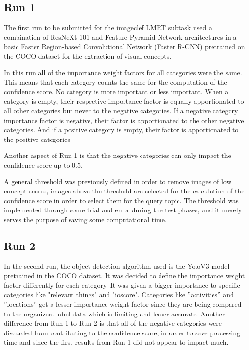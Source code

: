     \subsection{Run 1}

    The first run to be submitted for the imageclef LMRT subtask used a combination of ResNeXt-101 and Feature Pyramid Network architectures in a basic Faster Region-based Convolutional Network (Faster R-CNN) pretrained on the COCO dataset for the extraction of visual concepts.

    In this run all of the importance weight factors for all categories were the same. This means that each category counts the same for the computation of the confidence score. No category is more important or less important. When a category is empty, their respective importance factor is equally apportionated to all other categories but never to the negative categories. If a negative category importance factor is negative, their factor is apportionated to the other negative categories. And if a positive category is empty, their factor is apportionated to the positive categories.

    Another aspect of Run 1 is that the negative categories can only impact the confidence score up to 0.5.
    
    A general threshold was previously defined in order to remove images of low
concept scores, images above the threshold are selected for the calculation of the confidence score in order to select them for the query topic.  The threshold was implemented through some trial and error during the test phases, and it merely serves the purpose of saving some computational time.

    \subsection{Run 2}

    
    In the second run, the object detection algorithm used is the YoloV3 model pretrained in the COCO dataset.  It was decided to define the importance weight factor differently for each category. It was given a bigger importance to specific categories like "relevant things" and "ioscore". Categories like ”activities” and ”locations” get a lesser importance weight factor since they are being compared to the organizers label data which is limiting and lesser accurate.  Another difference from Run 1 to Run 2 is that all of the negative categories were discarded from contributing to the confidence score, in order to save processing time and since the first results from Run 1 did not appear to impact much.
    

